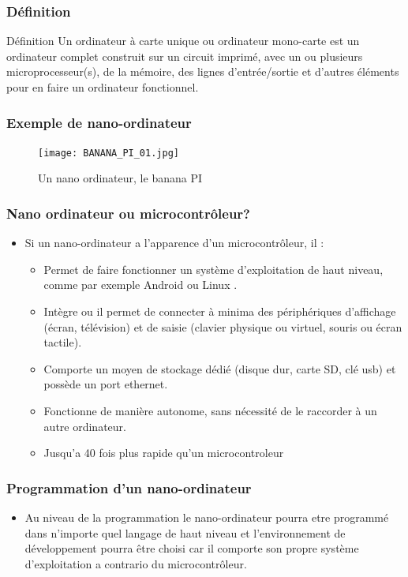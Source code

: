 \documentclass{beamer}
\begin{document}
\begin{frame}
\frametitle{Définition}
 \begin{block}{Définition}
 Un ordinateur à carte unique ou ordinateur mono-carte est un ordinateur complet construit sur un circuit imprimé,
 avec un ou plusieurs microprocesseur(s), de la mémoire, des lignes d'entrée/sortie et d'autres éléments pour en faire un ordinateur fonctionnel. 
 \end{block}
\end{frame}


\begin{frame}
\frametitle{Exemple de nano-ordinateur}
\begin{figure}[!h]
\centering
\texttt{[image: BANANA\_PI\_01.jpg]}
\caption{Un nano ordinateur, le banana PI}
\end{figure}
\end{frame}
\begin{frame}
\frametitle{Nano ordinateur ou microcontrôleur?}
\begin{itemize}
\item Si un nano-ordinateur a l’apparence d’un microcontrôleur, il :
\begin{itemize}
    \item Permet de faire fonctionner un système d’exploitation de haut niveau, comme par exemple Android ou Linux .
    \item Intègre ou il permet de connecter à minima des périphériques d’affichage (écran, télévision) et de saisie (clavier physique ou virtuel, souris ou écran tactile).
    \item Comporte un moyen de stockage dédié (disque dur, carte SD, clé usb) et possède un port ethernet.
    \item Fonctionne de manière autonome, sans nécessité de le raccorder à un autre ordinateur.
   \item Jusqu'a 40 fois plus rapide qu'un microcontroleur
\end{itemize}
\end{itemize}
\end{frame} 


\begin{frame}
\frametitle{Programmation d'un nano-ordinateur}
\begin{itemize}
    \item Au niveau de la programmation le nano-ordinateur pourra etre programmé dans n'importe quel langage de haut niveau et l'environnement de développement pourra être choisi car il comporte son propre système d'exploitation a contrario du microcontrôleur.
\end{itemize}
\end{frame}	
\end{document}
